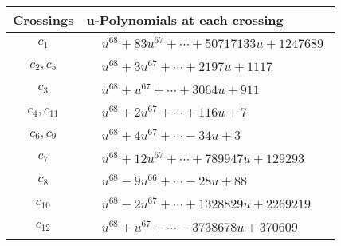 \documentclass[1p]{elsarticle_modified}
\theoremstyle{definition}
\begin{document}
\begin{tabular}{m{50pt}|m{274pt}}
Crossings & \hspace{64pt}u-Polynomials at each crossing \\
\hline $$\begin{aligned}c_{1}\end{aligned}$$&$\begin{aligned}
&u^{68}+83 u^{67}+\cdots+50717133 u+1247689
\end{aligned}$\\
\hline $$\begin{aligned}c_{2},c_{5}\end{aligned}$$&$\begin{aligned}
&u^{68}+3 u^{67}+\cdots+2197 u+1117
\end{aligned}$\\
\hline $$\begin{aligned}c_{3}\end{aligned}$$&$\begin{aligned}
&u^{68}+u^{67}+\cdots+3064 u+911
\end{aligned}$\\
\hline $$\begin{aligned}c_{4},c_{11}\end{aligned}$$&$\begin{aligned}
&u^{68}+2 u^{67}+\cdots+116 u+7
\end{aligned}$\\
\hline $$\begin{aligned}c_{6},c_{9}\end{aligned}$$&$\begin{aligned}
&u^{68}+4 u^{67}+\cdots-34 u+3
\end{aligned}$\\
\hline $$\begin{aligned}c_{7}\end{aligned}$$&$\begin{aligned}
&u^{68}+12 u^{67}+\cdots+789947 u+129293
\end{aligned}$\\
\hline $$\begin{aligned}c_{8}\end{aligned}$$&$\begin{aligned}
&u^{68}-9 u^{66}+\cdots-28 u+88
\end{aligned}$\\
\hline $$\begin{aligned}c_{10}\end{aligned}$$&$\begin{aligned}
&u^{68}-2 u^{67}+\cdots+1328829 u+2269219
\end{aligned}$\\
\hline $$\begin{aligned}c_{12}\end{aligned}$$&$\begin{aligned}
&u^{68}+u^{67}+\cdots-3738678 u+370609
\end{aligned}$\\
\hline
\end{tabular}\\~\\
\end{document}
